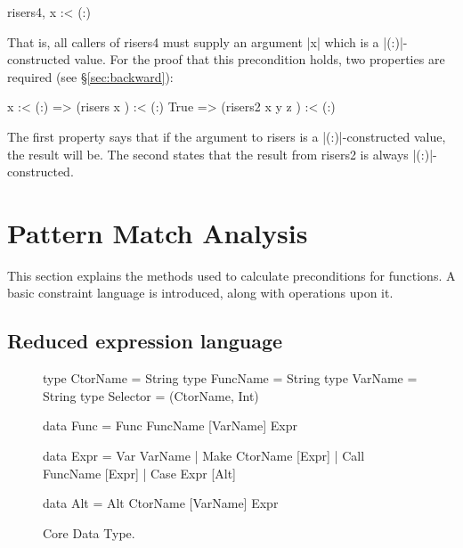 \documentclass[preprint]{sigplanconf}
\newcommand{\C}[1]{\textsf{#1}}
\newcommand{\ignore}{}
\begin{document}
\ignore\begin{code}
risers4, x :< (:)
\end{code}

\noindent That is, all callers of \C{risers4} must supply an argument |x| which is a |(:)|-constructed value. For the proof that this precondition holds, two properties are required (see \S\ref{sec:backward}):

\ignore\begin{code}
x :< (:)  => (risers x       ) :< (:)
True      => (risers2 x y z  ) :< (:)
\end{code}

\noindent The first property says that if the argument to \C{risers} is a |(:)|-constructed value, the result will be. The second states that the result from \C{risers2} is always |(:)|-constructed.

\section{Pattern Match Analysis}
\label{sec:manipulate}

This section explains the methods used to calculate preconditions for functions. A basic constraint language is introduced, along with operations upon it.

\subsection{Reduced expression language}
\label{sec:core}

\begin{figure}
\begin{code}
type CtorName  =  String
type FuncName  =  String
type VarName   =  String
type Selector  =  (CtorName, Int)

data Func  =  Func FuncName [VarName] Expr

data Expr  =  Var   VarName
           |  Make  CtorName  [Expr]
           |  Call  FuncName  [Expr]
           |  Case  Expr      [Alt]

data Alt   =  Alt CtorName [VarName] Expr
\end{code}
\caption{Core Data Type.}
\label{fig:core}
\end{figure}
\end{document}
